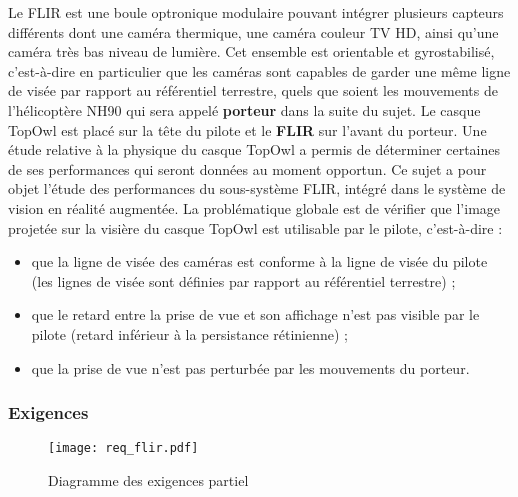 Le FLIR est une boule optronique modulaire pouvant intégrer plusieurs capteurs différents dont une caméra
thermique, une caméra couleur TV HD, ainsi qu'une caméra très bas niveau de lumière. Cet ensemble est
orientable et gyrostabilisé, c'est-à-dire en particulier que les caméras sont capables de garder une même ligne
de visée par rapport au référentiel terrestre, quels que soient les mouvements de l'hélicoptère NH90 qui sera
appelé \textbf{porteur} dans la suite du sujet. Le casque TopOwl est placé sur la tête du pilote et le \textbf{FLIR} sur l'avant
du porteur.
Une étude relative à la physique du casque TopOwl a permis de déterminer certaines de ses performances qui
seront données au moment opportun. Ce sujet a pour objet l'étude des performances du sous-système FLIR,
intégré dans le système de vision en réalité augmentée. La problématique globale est de vérifier que l'image
projetée sur la visière du casque TopOwl est utilisable par le pilote, c'est-à-dire :
\begin{itemize}
\item  que la ligne de visée des caméras est conforme à la ligne de visée du pilote (les lignes de visée sont définies
par rapport au référentiel terrestre) ;
\item que le retard entre la prise de vue et son affichage n'est pas visible par le pilote (retard inférieur à la
persistance rétinienne) ;
\item que la prise de vue n'est pas perturbée par les mouvements du porteur.
\end{itemize}


\subsubsection{Exigences}

\begin{figure}[!htb]
\begin{center}
\texttt{[image: req\_flir.pdf]}
\caption{Diagramme des exigences partiel \label{req_flir}}
\end{center}
\end{figure}


